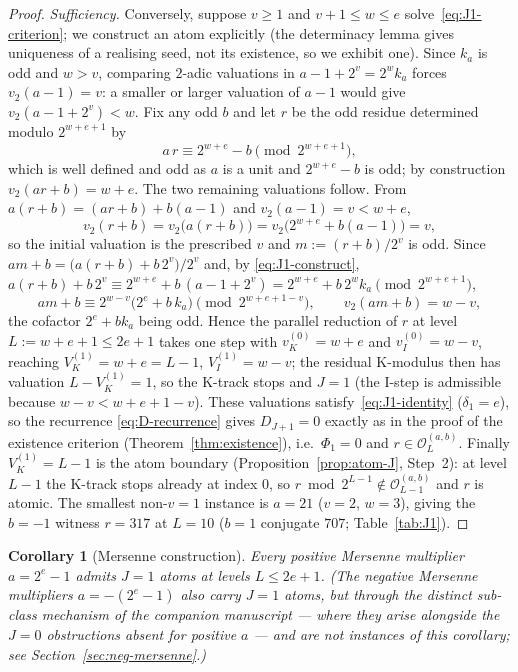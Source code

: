 \documentclass[11pt,reqno]{amsart}
\theoremstyle{plain}
\newtheorem{corollary}[theorem]{Corollary}
\theoremstyle{definition}
\theoremstyle{remark}
\newcommand{\Obs}{\mathcal{O}}
\newcommand{\Vk}{V_{K}}
\newcommand{\Vi}{V_{I}}
\newcommand{\vk}{v_{K}}
\newcommand{\vi}{v_{I}}
\newcommand{\vtwo}{v_{2}}
\newcommand{\Obsab}{\Obs_{L}^{(a,b)}}
\begin{document}
\begin{proof}
\emph{Sufficiency.} Conversely, suppose $v \ge 1$ and $v + 1 \le w \le e$
solve~\eqref{eq:J1-criterion}; we construct an atom explicitly (the
determinacy lemma gives uniqueness of a realising seed, not its existence,
so we exhibit one). Since $k_a$ is odd and $w > v$, comparing $2$-adic
valuations in $a - 1 + 2^v = 2^w k_a$ forces $\vtwo(a - 1) = v$: a smaller
or larger valuation of $a - 1$ would give $\vtwo(a - 1 + 2^v) < w$. Fix any
odd $b$ and let $r$ be the odd residue determined modulo $2^{w+e+1}$ by
\begin{equation}\label{eq:J1-construct}
a\,r \equiv 2^{w+e} - b \pmod{2^{w+e+1}},
\end{equation}
which is well defined and odd as $a$ is a unit and $2^{w+e} - b$ is odd; by
construction $\vtwo(a r + b) = w + e$. The two remaining valuations follow.
From $a(r + b) = (a r + b) + b(a - 1)$ and $\vtwo(a - 1) = v < w + e$,
\[
\vtwo(r + b) = \vtwo\bigl(a(r + b)\bigr)
            = \vtwo\bigl(2^{w+e} + b(a - 1)\bigr) = v,
\]
so the initial valuation is the prescribed $v$ and $m := (r + b)/2^v$ is
odd. Since $a m + b = \bigl(a(r + b) + b\,2^v\bigr)/2^v$ and, by
\eqref{eq:J1-construct},
$a(r + b) + b\,2^v \equiv 2^{w+e} + b\,(a - 1 + 2^v)
   = 2^{w+e} + b\,2^w k_a \pmod{2^{w+e+1}}$,
\[
a m + b \equiv 2^{w-v}\bigl(2^{e} + b\,k_a\bigr) \pmod{2^{w+e+1-v}},
\qquad \vtwo(a m + b) = w - v,
\]
the cofactor $2^e + b k_a$ being odd. Hence the parallel reduction of $r$ at
level $L := w + e + 1 \le 2e + 1$ takes one step with $\vk^{(0)} = w + e$
and $\vi^{(0)} = w - v$, reaching $\Vk^{(1)} = w + e = L - 1$,
$\Vi^{(1)} = w - v$; the residual K-modulus then has valuation
$L - \Vk^{(1)} = 1$, so the K-track stops and $J = 1$ (the I-step is
admissible because $w - v < w + e + 1 - v$). These valuations
satisfy~\eqref{eq:J1-identity} ($\delta_1 = e$), so the recurrence
\eqref{eq:D-recurrence} gives $D_{J+1} = 0$ exactly as in the proof of the
existence criterion (Theorem~\ref{thm:existence}), i.e.\ $\Phi_1 = 0$ and
$r \in \Obsab$. Finally $\Vk^{(1)} = L - 1$ is the atom boundary
(Proposition~\ref{prop:atom-J}, Step~2): at level $L - 1$ the K-track stops
already at index $0$, so $r \bmod 2^{L-1} \notin \Obs_{L-1}^{(a,b)}$ and $r$
is atomic. The smallest non-$v{=}1$ instance is $a = 21$ ($v = 2$, $w = 3$),
giving the $b = -1$ witness $r = 317$ at $L = 10$ ($b = 1$ conjugate $707$;
Table~\ref{tab:J1}).
\qedhere
\end{proof}

\begin{corollary}[Mersenne construction]\label{cor:mersenne}
Every positive Mersenne multiplier $a = 2^e - 1$ admits $J = 1$ atoms at
levels $L \le 2e + 1$. (The negative Mersenne multipliers $a = -(2^e - 1)$
also carry $J = 1$ atoms, but through the distinct sub-class mechanism of
the companion manuscript --- where they arise alongside the $J = 0$
obstructions absent for positive $a$ --- and are not instances of this
corollary; see Section~\ref{sec:neg-mersenne}.)
\end{corollary}
\end{document}
